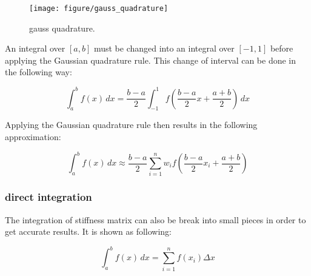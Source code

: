 \begin{figure}[h!]
\centering
\texttt{[image: figure/gauss\_quadrature]}
\caption{gauss quadrature.}
\label{fig:gaussquadrature}
\end{figure}

An integral over $ [a, b] $ must be changed into an integral over $ [-1, 1] $ before applying the Gaussian quadrature rule. This change of interval can be done in the following way:

\begin{equation*}
 \int _{a}^{b}f(x)\,dx={\frac {b-a}{2}}\int _{-1}^{1}f\left({\frac {b-a}{2}}x+{\frac {a+b}{2}}\right)\,dx
\end{equation*}

Applying the Gaussian quadrature rule then results in the following approximation:

\begin{equation*}
 \int _{a}^{b}f(x)\,dx\approx {\frac {b-a}{2}}\sum _{i=1}^{n}w_{i}f\left({\frac {b-a}{2}}x_{i}+{\frac {a+b}{2}}\right)
\end{equation*}

\subsubsection{direct integration}
The integration of stiffness matrix can also be break into small pieces in order to get accurate results. It is shown as following:

\begin{equation*}
\int _{a}^{b}f(x)\,dx=\sum_{i=1}^{n} f(x_i) \Delta x
\end{equation*}

